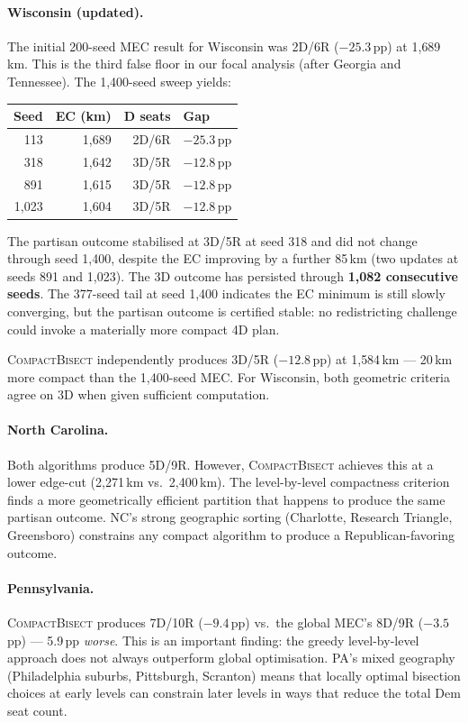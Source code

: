 \paragraph{Wisconsin (updated).}
The initial 200-seed MEC result for Wisconsin was 2D/6R ($-25.3$\,pp) at
1{,}689\,km. This is the third false floor in our focal analysis (after Georgia
and Tennessee). The 1{,}400-seed sweep yields:

\begin{center}
\begin{tabular}{rrrl}
\toprule
Seed & EC (km) & D seats & Gap \\
\midrule
113  & 1{,}689 & 2D/6R & $-25.3$\,pp \\
318  & 1{,}642 & 3D/5R & $-12.8$\,pp \\
891  & 1{,}615 & 3D/5R & $-12.8$\,pp \\
1{,}023 & 1{,}604 & 3D/5R & $-12.8$\,pp \\
\bottomrule
\end{tabular}
\end{center}

The partisan outcome stabilised at 3D/5R at seed 318 and did not change through
seed 1{,}400, despite the EC improving by a further 85\,km (two updates at
seeds 891 and 1{,}023). The 3D outcome has persisted through
\textbf{1{,}082 consecutive seeds}. The 377-seed tail at seed 1{,}400 indicates
the EC minimum is still slowly converging, but the partisan outcome is certified
stable: no redistricting challenge could invoke a materially more compact 4D plan.

\textsc{CompactBisect} independently produces 3D/5R ($-12.8$\,pp) at
1{,}584\,km --- 20\,km more compact than the 1{,}400-seed MEC. For Wisconsin,
both geometric criteria agree on 3D when given sufficient computation.

\paragraph{North Carolina.}
Both algorithms produce 5D/9R. However, \textsc{CompactBisect} achieves this
at a lower edge-cut (2{,}271\,km vs.\ 2{,}400\,km). The level-by-level
compactness criterion finds a more geometrically efficient partition that
happens to produce the same partisan outcome. NC's strong geographic sorting
(Charlotte, Research Triangle, Greensboro) constrains any compact algorithm
to produce a Republican-favoring outcome.

\paragraph{Pennsylvania.}
\textsc{CompactBisect} produces 7D/10R ($-9.4$\,pp) vs.\ the global MEC's
8D/9R ($-3.5$\,pp) --- 5.9\,pp \emph{worse}. This is an important finding:
the greedy level-by-level approach does not always outperform global
optimisation. PA's mixed geography (Philadelphia suburbs, Pittsburgh, Scranton)
means that locally optimal bisection choices at early levels can constrain
later levels in ways that reduce the total Dem seat count.

